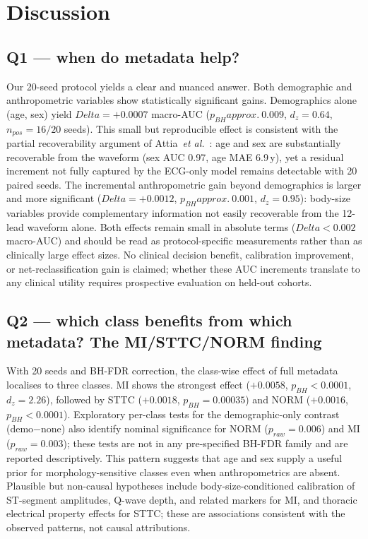 \documentclass[mathematics,article,pdftex]{Definitions/mdpi}
\def\texttt#1{#1}%
\def\mathrm#1{#1}%
\def\textbf#1{#1}%
\def\Delta{Delta }%
\def\approx{approx.\ }%
\begin{document}
\section{Discussion}\label{sec:discussion}

\subsection{Q1 --- when do metadata help?}
Our 20-seed protocol yields a clear and nuanced answer. \textbf{Both demographic and anthropometric variables show statistically significant gains.} Demographics alone (age, sex) yield $\Delta{=}+0.0007$ macro-AUC ($p_{\mathrm{BH}}{\approx}0.009$, $d_{\mathrm{z}}{=}0.64$, $n_{\mathrm{pos}}{=}16/20$ seeds). This small but reproducible effect is consistent with the partial recoverability argument of Attia~\textit{et al.}~\cite{Attia2019AgeSex}: age and sex are substantially recoverable from the waveform (sex AUC 0.97, age MAE 6.9\,y), yet a residual increment not fully captured by the ECG-only model remains detectable with 20 paired seeds. The incremental anthropometric gain beyond demographics is larger and more significant ($\Delta{=}+0.0012$, $p_{\mathrm{BH}}{\approx}0.001$, $d_{\mathrm{z}}{=}0.95$): body-size variables provide complementary information not easily recoverable from the 12-lead waveform alone. Both effects remain small in absolute terms ($\Delta{<}0.002$ macro-AUC) and should be read as protocol-specific measurements rather than as clinically large effect sizes. No clinical decision benefit, calibration improvement, or net-reclassification gain is claimed; whether these AUC increments translate to any clinical utility requires prospective evaluation on held-out cohorts.

\subsection{Q2 --- which class benefits from which metadata? The MI/STTC/NORM finding}
With 20 seeds and BH-FDR correction, the class-wise effect of full metadata localises to three classes. \textbf{MI} shows the strongest effect ($+0.0058$, $p_{\mathrm{BH}}{<}0.0001$, $d_{\mathrm{z}}{=}2.26$), followed by \textbf{STTC} ($+0.0018$, $p_{\mathrm{BH}}{=}0.00035$) and \textbf{NORM} ($+0.0016$, $p_{\mathrm{BH}}{<}0.0001$). Exploratory per-class tests for the demographic-only contrast (\texttt{demo}$-$\texttt{none}) also identify nominal significance for NORM ($p_{\mathrm{raw}}{=}0.006$) and MI ($p_{\mathrm{raw}}{=}0.003$); these tests are not in any pre-specified BH-FDR family and are reported descriptively. This pattern suggests that age and sex supply a useful prior for morphology-sensitive classes even when anthropometrics are absent. Plausible but non-causal hypotheses include body-size-conditioned calibration of ST-segment amplitudes, Q-wave depth, and related markers for MI, and thoracic electrical property effects for STTC; these are associations consistent with the observed patterns, not causal attributions.
\end{document}
